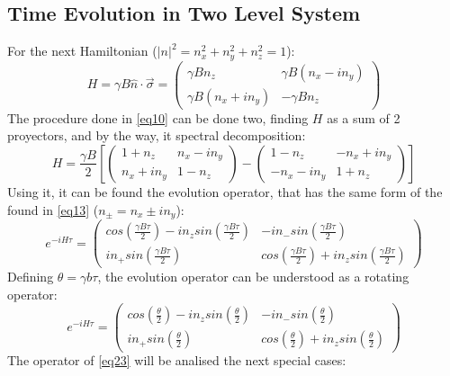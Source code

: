 \documentclass{article}
\begin{document}
\subsection{Time Evolution in Two Level System}
For the next Hamiltonian ($\lvert n\rvert^2=n_x^2+n_y^2+n_z^2=1$):
\begin{equation}\label{eq20}H=\gamma B\hat{n}\cdot\vec{\sigma}=\begin{pmatrix} \gamma B n_z & \gamma B (n_x-in_y)\\ \gamma B (n_x+in_y)& -\gamma B n_z \end{pmatrix}\end{equation}
The procedure done in \ref{eq10} can be done two, finding $H$ as a sum of 2 proyectors, and by the way, it spectral decomposition:
\begin{equation}\label{eq21}H=\frac{\gamma B}{2}[\begin{pmatrix}1+n_z& n_x-in_y\\n_x+in_y &1-n_z\end{pmatrix}-\begin{pmatrix}1-n_z&-n_x+in_y\\-n_x-in_y&1+n_z\end{pmatrix}]\end{equation}
Using it, it can be found the evolution operator, that has the same form of the found in \ref{eq13} ($n_\pm=n_x\pm in_y$):
\begin{equation}\label{eq22}e^{-iH\tau}=\begin{pmatrix} cos(\frac{\gamma B\tau}{2})-in_z sin(\frac{\gamma B \tau}{2})& -in_-sin(\frac{\gamma B \tau}{2}) \\ i n_+ sin(\frac{\gamma B \tau}{2}) & cos(\frac{\gamma B \tau}{2})+i n_z sin(\frac{\gamma B \tau}{2}) \end{pmatrix}\end{equation}
Defining $\theta=\gamma b \tau$, the evolution operator can be understood as a rotating operator:
\begin{equation}\label{eq23} e^{-iH\tau}=\begin{pmatrix} cos(\frac{\theta}{2})-in_z sin(\frac{\theta}{2})& -in_-sin(\frac{\theta}{2}) \\ in_+sin(\frac{\theta}{2}) & cos(\frac{\theta}{2})+i n_z sin(\frac{\theta}{2}) \end{pmatrix}\end{equation}
The operator of \ref{eq23} will be analised the next special cases:
\end{document}
